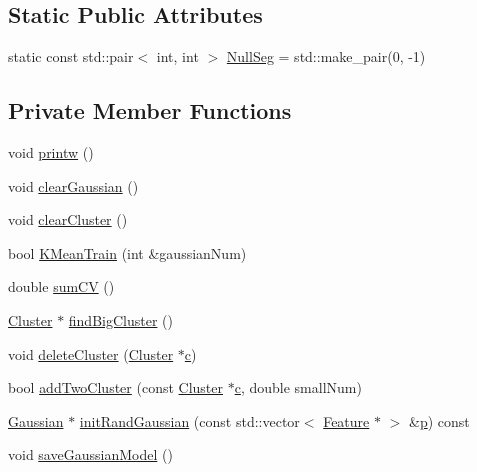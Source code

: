 \subsection*{Static Public Attributes}
\begin{DoxyCompactItemize}
\item 
static const std\+::pair$<$ int, int $>$ \hyperlink{class_k_mean_state_a56e790726e956e3a6eec8689a62faa21}{Null\+Seg} = std\+::make\+\_\+pair(0, -\/1)
\end{DoxyCompactItemize}
\subsection*{Private Member Functions}
\begin{DoxyCompactItemize}
\item 
void \hyperlink{class_k_mean_state_af2e7ccf68cc8f41f7aa17d9aa97a9545}{printw} ()
\item 
void \hyperlink{class_k_mean_state_a7cc9b161afa6973ed2a245888a17fab0}{clear\+Gaussian} ()
\item 
void \hyperlink{class_k_mean_state_a87563a0daed3aea1e982dcb0e594ebfb}{clear\+Cluster} ()
\item 
bool \hyperlink{class_k_mean_state_a06bd5d6d6087ba4fbdeaf96bd4b12d0b}{K\+Mean\+Train} (int \&gaussian\+Num)
\item 
double \hyperlink{class_k_mean_state_a33573c324c10bcf8931052a09ea5eaee}{sum\+C\+V} ()
\item 
\hyperlink{struct_cluster}{Cluster} $\ast$ \hyperlink{class_k_mean_state_af96cd123d3b608877f80b4800c47c30c}{find\+Big\+Cluster} ()
\item 
void \hyperlink{class_k_mean_state_aa33d3417885cbbefdf21238f90a5b67c}{delete\+Cluster} (\hyperlink{struct_cluster}{Cluster} $\ast$\hyperlink{lpc2spec_8m_aa49cfdd4fa4d74d71f78a001a1b635d0}{c})
\item 
bool \hyperlink{class_k_mean_state_aac9b8a6d5c756d8c896ca215478b6df4}{add\+Two\+Cluster} (const \hyperlink{struct_cluster}{Cluster} $\ast$\hyperlink{lpc2spec_8m_aa49cfdd4fa4d74d71f78a001a1b635d0}{c}, double small\+Num)
\item 
\hyperlink{class_gaussian}{Gaussian} $\ast$ \hyperlink{class_k_mean_state_a6855d47680f2be3117fff4a9ebf5c810}{init\+Rand\+Gaussian} (const std\+::vector$<$ \hyperlink{class_feature}{Feature} $\ast$ $>$ \&\hyperlink{_lex_tree_8cpp_a38b7c48bd51c4e6c004edc7cb91782b9}{p}) const 
\item 
void \hyperlink{class_k_mean_state_a51b0e303ecc0d55f467e7f6124730093}{save\+Gaussian\+Model} ()

\end{DoxyCompactItemize}
